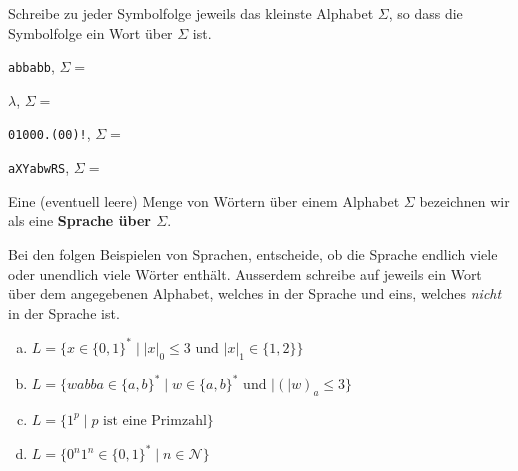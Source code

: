 \documentclass{article}
\newcommand{\abs}[1]{\lvert#1\rvert}
\begin{document}
\begin{exercise}[solution=true]
Schreibe zu jeder Symbolfolge jeweils das kleinste Alphabet \(\Sigma\), so dass die Symbolfolge ein Wort über \(\Sigma\) ist.
\begin{enumerate}[(a)]
{
    \item \texttt{abbabb}, \(\Sigma = \)
    \item \(\lambda\), \(\Sigma = \)
    \item \texttt{01000.(00)!},\hphantom{$xg(x)$} \(\Sigma = \)
    \item \texttt{aXYabwRS}, \(\Sigma = \)
    
}
\end{enumerate}
\end{exercise}

\begin{definition}
Eine (eventuell leere) Menge von Wörtern über einem Alphabet \(\Sigma\) bezeichnen wir als eine \textbf{Sprache über \(\Sigma\)}. 
\end{definition}

\begin{exercise}
Bei den folgen Beispielen von Sprachen, entscheide, ob die Sprache endlich viele oder unendlich viele Wörter enthält. Ausserdem schreibe auf jeweils ein Wort über dem angegebenen Alphabet, welches in der Sprache und eins, welches \emph{nicht} in der Sprache ist.

{
\begin{enumerate}[(a)]
    \item \(L = \{x \in \{0,1\}^* \mid \abs{x}_0 \leq 3 \text{ und } \abs{x}_1 \in \{1,2\}\}\) \\
    \blank[width=\linewidth]{}

    \item \(L = \{wabba \in \{a,b\}^* \mid w \in \{a, b\}^* \text{ und } \abs(w)_a \leq 3\}\) \\
    \blank[width=\linewidth]{}
    
    \item \(L = \{1^p \mid p \text{ ist eine Primzahl}\}\) \\
    \blank[width=\linewidth]{}
    
    \item \(L = \{0^n 1^n \in \{0, 1\}^* \mid n \in \mathcal{N}\}\) \\
    \blank[width=\linewidth]{}
\end{enumerate}
}
\end{exercise}
\end{document}
